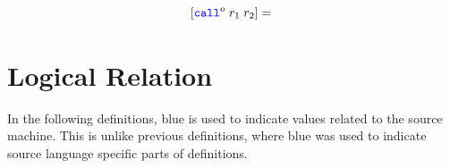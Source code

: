 \documentclass[a3paper]{article}
\newcommand{\sourcecolor}{\color{blue}}
\newcommand{\src}[1]{{\sourcecolor #1}}
\newcommand{\zinstr}[1]{\texttt{#1}}
\newcommand{\scall}[4][]{  
\ifthenelse{\equal{#3#4}{}}
  {\ensuremath{\zinstr{\src{call}}_{#1}^{#2}}}
  {\ensuremath{\zinstr{\src{call}}_{#1}^{#2} \; #3 \; #4}}
}
\newcommand{\comp}[1]{[#1]}
\begin{document}
\[
  \comp{\scall{o}{r_1}{r_2}} = 
  \begin{array}[t]{l}
  \end{array}
\]

\clearpage

\section{Logical Relation}
In the following definitions, \src{blue} is used to indicate values related to the source machine. This is unlike previous definitions, where \src{blue} was used to indicate source language specific parts of definitions.
\end{document}
